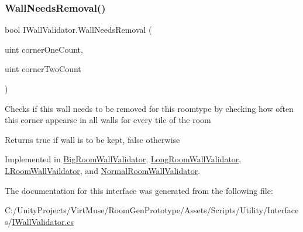 \subsubsection{\texorpdfstring{Wall\+Needs\+Removal()}{WallNeedsRemoval()}}
{\footnotesize\ttfamily bool I\+Wall\+Validator.\+Wall\+Needs\+Removal (\begin{DoxyParamCaption}\item[{uint}]{corner\+One\+Count,  }\item[{uint}]{corner\+Two\+Count }\end{DoxyParamCaption})}



Checks if this wall needs to be removed for this roomtype by checking how often this corner appearse in all walls for every tile of the room 

\begin{DoxyReturn}{Returns}
true if wall is to be kept, false otherwise
\end{DoxyReturn}


Implemented in \mbox{\hyperlink{class_big_room_wall_validator_abc5968ccc9e70e3d5b8de7ccff2c69bb}{Big\+Room\+Wall\+Validator}}, \mbox{\hyperlink{class_long_room_wall_validator_a552c1bbadec7bc3ab93a3fae2e512ebe}{Long\+Room\+Wall\+Validator}}, \mbox{\hyperlink{class_l_room_wall_vaildator_a1de3495c1d8cc0a4591b617d2137b497}{L\+Room\+Wall\+Vaildator}}, and \mbox{\hyperlink{class_normal_room_wall_validator_a30c0496c8203077f3c327da93f38f7c7}{Normal\+Room\+Wall\+Validator}}.



The documentation for this interface was generated from the following file\+:\begin{DoxyCompactItemize}
\item 
C\+:/\+Unity\+Projects/\+Virt\+Muse/\+Room\+Gen\+Prototype/\+Assets/\+Scripts/\+Utility/\+Interfaces/\mbox{\hyperlink{_i_wall_validator_8cs}{I\+Wall\+Validator.\+cs}}\end{DoxyCompactItemize}
